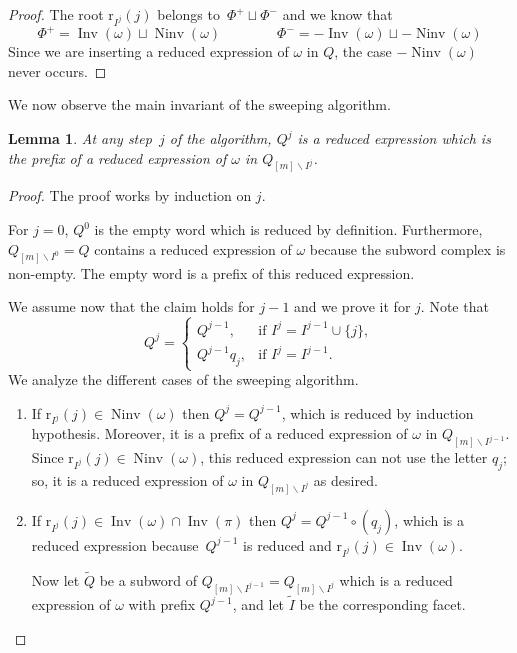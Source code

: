 \documentclass[reqno]{amsart}
\newtheorem{lemma}[theorem]{Lemma}
\theoremstyle{definition}
\newcommand{\ssm}{\smallsetminus} %
\DeclareMathOperator{\Inv}{Inv} %
\DeclareMathOperator{\Ninv}{Ninv} %
\newcommand{\rootFunction}[2]{\mathrm{r}_{#1}(#2)} %
\begin{document}
\begin{proof}
The root $\rootFunction{I^j}{j}$ belongs to~$\Phi^+ \sqcup \Phi^-$ and we know that
\[
\Phi^+ = \Inv(\omega) \sqcup \Ninv(\omega) \qquad \qquad
\Phi^- = -\Inv(\omega) \sqcup -\Ninv(\omega)  
\]
Since we are inserting a reduced expression of $\omega$ in $Q$, the case $-\Ninv(\omega)$ never occurs.
\end{proof}

We now observe the main invariant of the sweeping algorithm.

\begin{lemma}
\label{lem:sweeping2}
At any step~$j$ of the algorithm, $Q^j$ is a reduced expression which is the prefix of a reduced expression of $\omega$ in $Q_{[m]\ssm I^j}$.
\end{lemma}

\begin{proof}
The proof works by induction on $j$.

For $j=0$, $Q^0$ is the empty word which is reduced by definition.
Furthermore, $Q_{[m]\ssm I^0 }=Q$ contains a reduced expression of $\omega$ because the subword complex is non-empty.
The empty word is a prefix of this reduced expression. 

We assume now that the claim holds for $j-1$ and we prove it for $j$.
Note that 
\[
Q^j = 
\begin{cases}
Q^{j-1}, & \text{if } I^j=I^{j-1}\cup \{j\} ,\\
Q^{j-1} q_j, & \text{if } I^j=I^{j-1}.
\end{cases}
\]
We analyze the different cases of the sweeping algorithm.
\begin{enumerate}
    \item If $\rootFunction{I^j}{j}\in \Ninv(\omega)$ then 
    $Q^j=Q^{j-1}$, which is reduced by induction hypothesis.
    Moreover, it is a prefix of a reduced expression of $\omega$ in $Q_{[m]\ssm I^{j-1}}$.
    Since $\rootFunction{I^j}{j}\in \Ninv(\omega)$, this reduced expression can not use the letter $q_j$; so, it is a reduced expression of $\omega$ in $Q_{[m]\ssm I^{j}}$ as desired.
    \item If $\rootFunction{I^j}{j}\in \Inv(\omega) \cap \Inv(\pi)$ then $Q^j= Q^{j-1}\circ (q_j)$, which is a reduced expression because~$Q^{j-1}$ is reduced and $\rootFunction{I^j}{j}\in \Inv(\omega)$.
    
    Now let $\widetilde Q$ be a subword of $Q_{[m]\ssm I^{j-1}}=Q_{[m]\ssm I^{j}}$ which is a reduced expression of $\omega$ with prefix $Q^{j-1}$, and let $\widetilde I$ be the corresponding facet.
    

\end{enumerate}
\end{proof}
\end{document}
